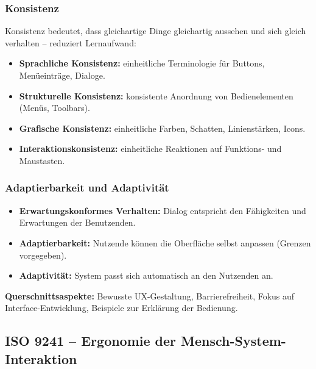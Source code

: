 \documentclass[12pt, a4paper]{article}
\begin{document}
\subsubsection*{Konsistenz}

Konsistenz bedeutet, dass gleichartige Dinge gleichartig aussehen und sich gleich verhalten -- reduziert Lernaufwand:
\begin{itemize}
  \item \textbf{Sprachliche Konsistenz:} einheitliche Terminologie für Buttons, Menüeinträge, Dialoge.
  \item \textbf{Strukturelle Konsistenz:} konsistente Anordnung von Bedienelementen (Menüs, Toolbars).
  \item \textbf{Grafische Konsistenz:} einheitliche Farben, Schatten, Linienstärken, Icons.
  \item \textbf{Interaktionskonsistenz:} einheitliche Reaktionen auf Funktions- und Maustasten.
\end{itemize}

\subsubsection*{Adaptierbarkeit und Adaptivität}
\begin{itemize}
  \item \textbf{Erwartungskonformes Verhalten:} Dialog entspricht den Fähigkeiten und Erwartungen der Benutzenden.
  \item \textbf{Adaptierbarkeit:} Nutzende können die Oberfläche selbst anpassen (Grenzen vorgegeben).
  \item \textbf{Adaptivität:} System passt sich automatisch an den Nutzenden an.
\end{itemize}

\textbf{Querschnittsaspekte:} Bewusste UX-Gestaltung, Barrierefreiheit, Fokus auf Interface-Entwicklung, Beispiele zur Erklärung der Bedienung.

\subsection{ISO 9241 -- Ergonomie der Mensch-System-Interaktion}
\end{document}
